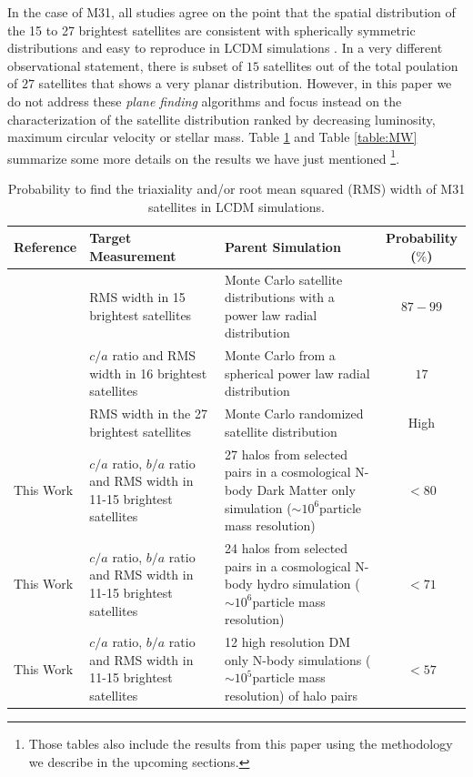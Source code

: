 \documentclass[a4paper,fleqn,usenatbib]{mnras}
\newcommand{\Msun}{{\ifmmode{{\rm{M_{\odot}}}}\else{${\rm{M_{\odot}}}$}\fi}}
\begin{document}
In the case of M31, all studies agree on the point that the spatial
distribution of the 15 to 27 brightest satellites  are consistent with
spherically symmetric distributions and easy to reproduce in LCDM simulations
\citep{2006AJ....131.1405K,2007MNRAS.374.1125M, 2013ApJ...766..120C}.
In a very different observational statement, there is  subset of $15$
satellites out of the  total poulation of $27$ satellites
\citep{2013ApJ...766..120C, 2013Natur.493...62I} that shows a very
planar distribution. 
However, in this paper we do not address these \emph{plane finding}
algorithms and focus instead on the characterization of the satellite
distribution ranked by decreasing luminosity, maximum circular
velocity or stellar mass.  
Table \ref{table:M31} and Table \ref{table:MW} summarize some more
details on the results we have just mentioned \footnote{
Those tables also include the results from this paper using the
methodology we describe in the upcoming sections.}.

\begin{table}
\centering
\begin{tabular}{|p{4.0cm}|p{4.5cm}| p{5.5cm}| c|}\hline
Reference & Target Measurement & Parent Simulation & Probability ($\%$)\\\hline
\text{\cite{2006AJ....131.1405K}} & RMS width in 15 brightest
satellites & Monte Carlo satellite distributions with a power law
radial distribution & $87-99$\\
\text{\cite{2007MNRAS.374.1125M}} & $c/a$ ratio and RMS width in 16 brightest satellites & Monte Carlo from a spherical power law radial
distribution & $17$\\
\text{\cite{2013ApJ...766..120C}}& RMS width in the 27 brightest
satellites & Monte Carlo randomized satellite distribution & High\\
This Work & $c/a$ ratio, $b/a$ ratio and RMS width in 11-15 brightest
satellites & 27 halos from selected pairs in a cosmological N-body Dark Matter only simulation ($\sim
10^{6}$\Msun particle mass resolution)& $<80$ \\
This Work & $c/a$ ratio, $b/a$ ratio and RMS width in 11-15 brightest
satellites & 24 halos from selected pairs in a cosmological N-body hydro simulation ($\sim
10^{6}$\Msun particle mass resolution)& $<71$ \\
This Work & $c/a$ ratio, $b/a$ ratio and RMS width in 11-15 brightest
satellites & 12 high resolution DM only N-body simulations ($\sim
10^{5}$\Msun particle mass resolution) of halo pairs & $<57$ \\
\hline
\end{tabular}
\caption{Probability to find  the triaxiality and/or root mean squared
  (RMS) width of M31 satellites in LCDM simulations. 
\label{table:M31}}
\end{table}
\end{document}
